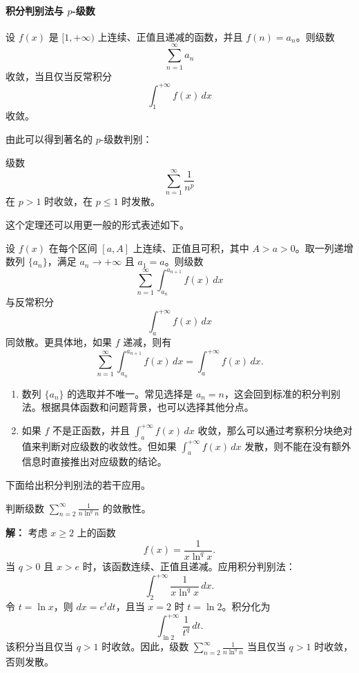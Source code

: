 \paragraph{积分判别法与 $p$-级数}

\begin{theorem}[积分判别法]
设 $f(x)$ 是 $[1,+\infty)$ 上连续、正值且递减的函数，并且 $f(n)=a_n$。则级数
\[
    \sum_{n=1}^{\infty}a_n
\]
收敛，当且仅当反常积分
\[
    \int_1^{+\infty}f(x)\,dx
\]
收敛。
\end{theorem}

由此可以得到著名的 $p$-级数判别：

\begin{corollary}[$p$-级数]
级数
\[
    \sum_{n=1}^{\infty}\frac{1}{n^p}
\]
在 $p>1$ 时收敛，在 $p\leq1$ 时发散。
\end{corollary}

这个定理还可以用更一般的形式表述如下。

\newpage

\begin{theorem}
设 $f(x)$ 在每个区间 $[a,A]$ 上连续、正值且可积，其中 $A>a>0$。取一列递增数列 $\{a_n\}$，满足 $a_n\to+\infty$ 且 $a_1=a$。则级数
\[
    \sum_{n=1}^{\infty}\int_{a_n}^{a_{n+1}}f(x)\,dx
\]
与反常积分
\[
    \int_a^{+\infty}f(x)\,dx
\]
同敛散。更具体地，如果 $f$ 递减，则有
\[
    \sum_{n=1}^{\infty}\int_{a_n}^{a_{n+1}}f(x)\,dx
    =\int_a^{+\infty}f(x)\,dx.
\]
\end{theorem}

\begin{remark}
\begin{enumerate}
    \item 数列 $\{a_n\}$ 的选取并不唯一。常见选择是 $a_n=n$，这会回到标准的积分判别法。根据具体函数和问题背景，也可以选择其他分点。
    \item 如果 $f$ 不是正函数，并且 $\int_a^{+\infty}f(x)\,dx$ 收敛，那么可以通过考察积分块绝对值来判断对应级数的收敛性。但如果 $\int_a^{+\infty}f(x)\,dx$ 发散，则不能在没有额外信息时直接推出对应级数的结论。
\end{enumerate}
\end{remark}

下面给出积分判别法的若干应用。

\begin{example}
判断级数 $\sum_{n=2}^{\infty}\frac{1}{n\ln^q n}$ 的敛散性。

\textbf{解：} 考虑 $x\geq2$ 上的函数
\[
    f(x)=\frac{1}{x\ln^q x}.
\]
当 $q>0$ 且 $x>e$ 时，该函数连续、正值且递减。应用积分判别法：
\[
    \int_2^{+\infty}\frac{1}{x\ln^q x}\,dx.
\]
令 $t=\ln x$，则 $dx=e^t dt$，且当 $x=2$ 时 $t=\ln 2$。积分化为
\[
    \int_{\ln 2}^{+\infty}\frac{1}{t^q}\,dt.
\]
该积分当且仅当 $q>1$ 时收敛。因此，级数 $\sum_{n=2}^{\infty}\frac{1}{n\ln^q n}$ 当且仅当 $q>1$ 时收敛，否则发散。
\end{example}

